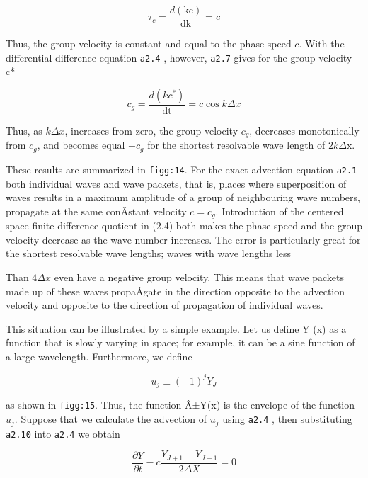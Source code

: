 {\[\tau_{c} = \frac{d\left( \text{kc} \right)}{\text{dk}} = c\]}

Thus, the group velocity is constant and equal to the phase speed \(c\).
With the differential-difference equation \texttt{a2.4} , however,
\texttt{a2.7} gives for the group velocity c*

{\[c_{g} = \frac{d\left( kc^{*} \right)}{\text{dt}} = c\cos{k\Delta x}\]}

Thus, as \(k\Delta x\), increases from zero, the group velocity
\(c_{g}\), decreases monotonically from \(c_{g}\), and becomes equal
\({- c}_{g}\) for the shortest resolvable wave length of
\(2k\Delta\text{x.}\)

These results are summarized in \texttt{figg:14}. For the exact
advection equation \texttt{a2.1} both individual waves and wave packets,
that is, places where superposition of waves results in a maximum
amplitude of a group of neighbouring wave numbers, propagate at the same
conÂ­stant velocity \(c = c_{g}\). Introduction of the centered space
finite difference quotient in (2.4) both makes the phase speed and the
group velocity decrease as the wave number increases. The error is
particularly great for the shortest resolvable wave lengths; waves with
wave lengths less

\begin{figure}
\centering
{}
\caption{}
\end{figure}

Than \(4\Delta x\) even have a negative group velocity. This means that
wave packets made up of these waves propaÂ­gate in the direction opposite
to the advection velocity and opposite to the direction of propagation
of individual waves.

This situation can be illustrated by a simple example. Let us define Y
(x) as a function that is slowly varying in space; for example, it can
be a sine function of a large wavelength. Furthermore, we define

{\[u_{j} \equiv \left( - 1 \right)^{j}Y_{J}\]}

as shown in \texttt{figg:15}. Thus, the function Â±Y(x) is the envelope
of the function \(u_{j}\). Suppose that we calculate the advection of
\(u_{j}\) using \texttt{a2.4} , then substituting \texttt{a2.10} into
\texttt{a2.4} we obtain

\[\frac{\partial Y}{\partial t} - c\frac{Y_{J + 1} - Y_{J - 1}}{2\Delta X} = 0\]

